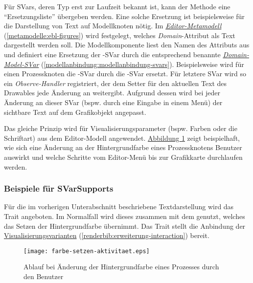 \documentclass[a4paper,10pt]{sphinxmanual}
\begin{document}
Für SVars, deren Typ erst zur Laufzeit bekannt ist, kann der Methode eine "`Ersetzungsliste"' übergeben werden.
Eine solche Ersetzung ist beispielsweise für die Darstellung von Text auf Modellknoten nötig.
Im {\hyperref[metamodelle:ebl-figures]{\emph{Editor-Metamodell}}} (\autoref*{metamodelle:ebl-figures}) wird festgelegt, welches \emph{Domain}-Attribut als Text dargestellt werden soll.
Die Modellkomponente liest den Namen des Attributs aus und definiert eine Ersetzung der -SVar durch die entsprechend benannte {\hyperref[modellanbindung:modellanbindung-svars]{\emph{Domain-Model-SVar}}} (\autoref*{modellanbindung:modellanbindung-svars}).
Beispielsweise wird für einen Prozessknoten die -SVar durch die -SVar ersetzt.
Für letztere SVar wird so ein \emph{Observe-Handler} registriert, der dem Setter für den aktuellen Text des Drawables jede Änderung an  weitergibt.
Aufgrund dessen wird bei jeder Änderung an dieser SVar (bspw. durch eine Eingabe in einem Menü) der sichtbare Text auf dem Grafikobjekt angepasst.

Das gleiche Prinzip wird für Visualisierungsparameter (bspw. Farben oder die Schriftart) aus dem Editor-Modell angewendet.
\hyperref[renderbib:farbe-setzen-aktivitaet]{Abbildung  \ref*{renderbib:farbe-setzen-aktivitaet}} zeigt beispielhaft, wie sich eine Änderung an der Hintergrundfarbe eines Prozessknotens Benutzer auswirkt und welche Schritte vom Editor-Menü bis zur Grafikkarte durchlaufen werden.


\subsubsection{Beispiele für SVarSupports}
\label{renderbib:beispiele-fur-svarsupports}
Für die im vorherigen Unterabschnitt beschriebene Textdarstellung wird das Trait  angeboten.
Im Normalfall wird dieses zusammen mit dem  genutzt, welches das Setzen der Hintergrundfarbe übernimmt.
Das Trait  stellt die Anbindung der {\hyperref[renderbib:erweiterung-interaction]{Visualisierungsvarianten}} (\autoref*{renderbib:erweiterung-interaction}) bereit.
\begin{figure}[htbp]
\centering
\capstart

\texttt{[image: farbe-setzen-aktivitaet.eps]}
\caption{Ablauf bei Änderung der Hintergrundfarbe eines Prozesses durch den Benutzer}\label{renderbib:farbe-setzen-aktivitaet}\end{figure}
\pagebreak
\end{document}
